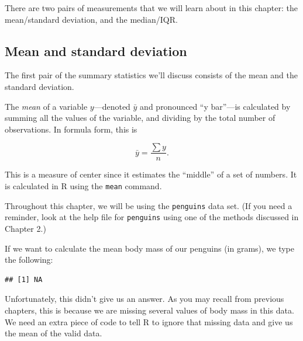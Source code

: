 \documentclass[
]{book}
\newenvironment{Shaded}{\begin{snugshade}}{\end{snugshade}}
\newcommand{\AttributeTok}[1]{\textcolor[rgb]{0.77,0.63,0.00}{#1}}
\newcommand{\ConstantTok}[1]{\textcolor[rgb]{0.00,0.00,0.00}{#1}}
\newcommand{\FunctionTok}[1]{\textcolor[rgb]{0.00,0.00,0.00}{#1}}
\newcommand{\NormalTok}[1]{#1}
\newcommand{\SpecialCharTok}[1]{\textcolor[rgb]{0.00,0.00,0.00}{#1}}
\begin{document}
There are two pairs of measurements that we will learn about in this chapter: the mean/standard deviation, and the median/IQR.

\hypertarget{numerical-mean-sd}{%
\subsection{Mean and standard deviation}\label{numerical-mean-sd}}

The first pair of the summary statistics we'll discuss consists of the mean and the standard deviation.

The \emph{mean} of a variable \(y\)---denoted \(\bar{y}\) and pronounced ``y bar''---is calculated by summing all the values of the variable, and dividing by the total number of observations. In formula form, this is

\[
\bar{y} = \frac{\sum y}{n}.
\]

This is a measure of center since it estimates the ``middle'' of a set of numbers. It is calculated in R using the \texttt{mean} command.

Throughout this chapter, we will be using the \texttt{penguins} data set. (If you need a reminder, look at the help file for \texttt{penguins} using one of the methods discussed in Chapter 2.)

If we want to calculate the mean body mass of our penguins (in grams), we type the following:

\begin{Shaded}
\end{Shaded}

\begin{verbatim}
## [1] NA
\end{verbatim}

Unfortunately, this didn't give us an answer. As you may recall from previous chapters, this is because we are missing several values of body mass in this data. We need an extra piece of code to tell R to ignore that missing data and give us the mean of the valid data.

\begin{Shaded}
\end{Shaded}
\end{document}
